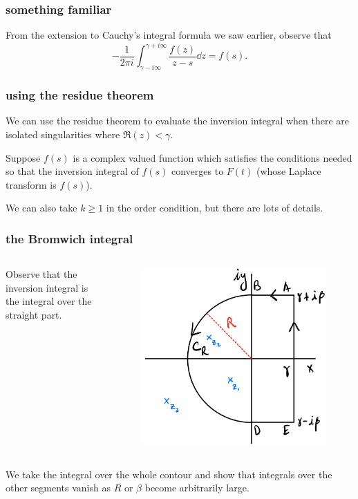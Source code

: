 \documentclass[mathserif]{beamer}
\begin{document}
\begin{frame}
  \frametitle{something familiar}

  From the extension to Cauchy's integral formula we saw earlier, observe that \[-\frac{1}{2\pi i}\int_{\gamma-i\infty}^{\gamma+i\infty} \frac{f(z)}{z-s}\dd{z} = f(s).\]

\end{frame}

\begin{frame}
  \frametitle{using the residue theorem}

  We can use the residue theorem to evaluate the inversion integral when there are isolated singularities where $\Re(z) < \gamma$.

  Suppose $f(s)$ is a complex valued function which satisfies the conditions needed so that the inversion integral of $f(s)$ converges to $F(t)$ (whose Laplace transform is $f(s)$).

  We can also take $k\geq 1$ in the order condition, but there are lots of details.

\end{frame}

\begin{frame}
  \frametitle{the Bromwich integral}

  \begin{columns}
  Observe that the inversion integral is the integral over the straight part.
    \begin{figure}[h]
      \centering
      \includegraphics[scale=0.25]{3}
    \end{figure}
  \end{columns}

  We take the integral over the whole contour and show that integrals over the other segments vanish as $R$ or $\beta$ become arbitrarily large.

\end{frame}
\end{document}
